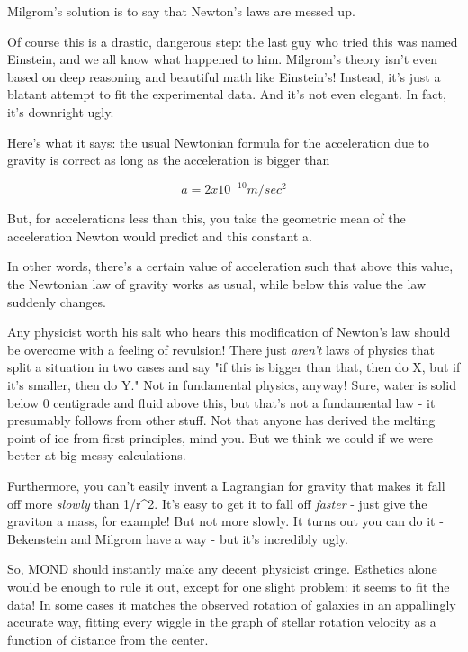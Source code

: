 Milgrom's solution is to say that Newton's laws are messed up.

Of course this is a drastic, dangerous step: the last guy who tried this
was named Einstein, and we all know what happened to him.  Milgrom's theory 
isn't even based on deep reasoning and beautiful math like Einstein's!  
Instead, it's just a blatant attempt to fit the experimental data.  
And it's not even elegant.  In fact, it's downright ugly.

Here's what it says: the usual Newtonian formula for the acceleration 
due to gravity is correct as long as the acceleration is bigger than


$$

a = 2 x 10^{-10} m/sec^{2}   
$$
    
But, for accelerations less than this, you take the geometric mean
of the acceleration Newton would predict and this constant a.

In other words, there's a certain value of acceleration such that above
this value, the Newtonian law of gravity works as usual, while below this
value the law suddenly changes.

Any physicist worth his salt who hears this modification of Newton's law
should be overcome with a feeling of revulsion!  There just \emph{aren't} 
laws
of physics that split a situation in two cases and say "if this is bigger
than that, then do X, but if it's smaller, then do Y."  Not in fundamental
physics, anyway!  Sure, water is solid below 0 centigrade and fluid above
this, but that's not a fundamental law - it presumably follows from other 
stuff.  Not that anyone has derived the melting point of ice from first
principles, mind you.  But we think we could if we were better at big
messy calculations.

Furthermore, you can't easily invent a Lagrangian for gravity that makes 
it fall off more \emph{slowly} than 1/r^{2}.  
It's easy to get it to fall off 
\emph{faster} - just give the graviton a mass, for example!  But not more 
slowly.  It turns out you can do it - Bekenstein and Milgrom have a way - 
but it's incredibly ugly. 

So, MOND should instantly make any decent physicist cringe.  Esthetics 
alone would be enough to rule it out, except for one slight problem: it 
seems to fit the data!  In some cases it matches the observed rotation of 
galaxies in an appallingly accurate way, fitting every wiggle in the graph
of stellar rotation velocity as a function of distance from the center.


